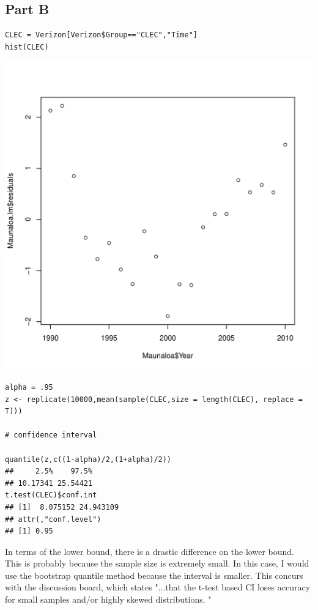 \documentclass{article}\usepackage[]{graphicx}\usepackage[]{color}
\makeatletter
\newenvironment{kframe}{%
 \def\at@end@of@kframe{}%
 \ifinner\ifhmode%
  \def\at@end@of@kframe{\end{minipage}}%
  \begin{minipage}{\columnwidth}%
 \fi\fi%
 \def\FrameCommand##1{\hskip\@totalleftmargin \hskip-\fboxsep
 \colorbox{shadecolor}{##1}\hskip-\fboxsep
     \hskip-\linewidth \hskip-\@totalleftmargin \hskip\columnwidth}%
 \MakeFramed {\advance\hsize-\width
   \@totalleftmargin\z@ \linewidth\hsize
   \@setminipage}}%
 {\par\unskip\endMakeFramed%
 \at@end@of@kframe}
\newenvironment{knitrout}{}{} %
\makeatother
\begin{document}
\subsection*{Part B}
\begin{knitrout}
\color{fgcolor}\begin{kframe}
\begin{verbatim}
CLEC = Verizon[Verizon$Group=="CLEC","Time"]
hist(CLEC)
\end{verbatim}
\end{kframe}
\includegraphics[width=0.33\linewidth]{figure/unnamed-chunk-12-1} 
\begin{kframe}\begin{verbatim}
alpha = .95
z <- replicate(10000,mean(sample(CLEC,size = length(CLEC), replace = T)))

# confidence interval

quantile(z,c((1-alpha)/2,(1+alpha)/2))
##     2.5%    97.5% 
## 10.17341 25.54421
t.test(CLEC)$conf.int
## [1]  8.075152 24.943109
## attr(,"conf.level")
## [1] 0.95
\end{verbatim}
\end{kframe}
\end{knitrout}
In terms of the lower bound, there is a drastic difference on the lower bound. This is probably because the sample size is extremely small. In this case, I would use the bootstrap quantile method because the interval is smaller. This concurs with the discussion board, which states "...that the t-test based CI loses accuracy for small samples and/or highly skewed distributions. "  
\end{document}

